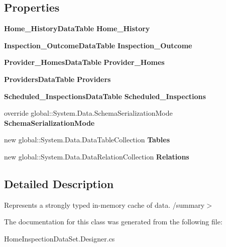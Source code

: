 \subsection*{Properties}
\begin{DoxyCompactItemize}
\item 
\mbox{\label{class_a_f_h___scheduler_1_1_home_inspection_data_set_a5b4a3283ce5cac0d95ab54231b23801f}} 
\textbf{ Home\+\_\+\+History\+Data\+Table} {\bfseries Home\+\_\+\+History}\hspace{0.3cm}{\ttfamily  [get]}
\item 
\mbox{\label{class_a_f_h___scheduler_1_1_home_inspection_data_set_aa67be549f5a69084e4bb2acc0aa57d90}} 
\textbf{ Inspection\+\_\+\+Outcome\+Data\+Table} {\bfseries Inspection\+\_\+\+Outcome}\hspace{0.3cm}{\ttfamily  [get]}
\item 
\mbox{\label{class_a_f_h___scheduler_1_1_home_inspection_data_set_a30281cc479eac359fd8ec7beda0f7ffd}} 
\textbf{ Provider\+\_\+\+Homes\+Data\+Table} {\bfseries Provider\+\_\+\+Homes}\hspace{0.3cm}{\ttfamily  [get]}
\item 
\mbox{\label{class_a_f_h___scheduler_1_1_home_inspection_data_set_a1af144b470ec672b49c080f757c15429}} 
\textbf{ Providers\+Data\+Table} {\bfseries Providers}\hspace{0.3cm}{\ttfamily  [get]}
\item 
\mbox{\label{class_a_f_h___scheduler_1_1_home_inspection_data_set_afa9a91b66178eadc2066650740618038}} 
\textbf{ Scheduled\+\_\+\+Inspections\+Data\+Table} {\bfseries Scheduled\+\_\+\+Inspections}\hspace{0.3cm}{\ttfamily  [get]}
\item 
\mbox{\label{class_a_f_h___scheduler_1_1_home_inspection_data_set_a5cd31d4516a14a98b37bbe6ce3e0f480}} 
override global\+::\+System.\+Data.\+Schema\+Serialization\+Mode {\bfseries Schema\+Serialization\+Mode}\hspace{0.3cm}{\ttfamily  [get, set]}
\item 
\mbox{\label{class_a_f_h___scheduler_1_1_home_inspection_data_set_a9e473e3c80dd98a68be25082891e93d4}} 
new global\+::\+System.\+Data.\+Data\+Table\+Collection {\bfseries Tables}\hspace{0.3cm}{\ttfamily  [get]}
\item 
\mbox{\label{class_a_f_h___scheduler_1_1_home_inspection_data_set_a733a05a186c9855a86fd314ca9747a16}} 
new global\+::\+System.\+Data.\+Data\+Relation\+Collection {\bfseries Relations}\hspace{0.3cm}{\ttfamily  [get]}
\end{DoxyCompactItemize}


\subsection{Detailed Description}
Represents a strongly typed in-\/memory cache of data. /summary$>$ 

The documentation for this class was generated from the following file\+:\begin{DoxyCompactItemize}
\item 
Home\+Inspection\+Data\+Set.\+Designer.\+cs\end{DoxyCompactItemize}
